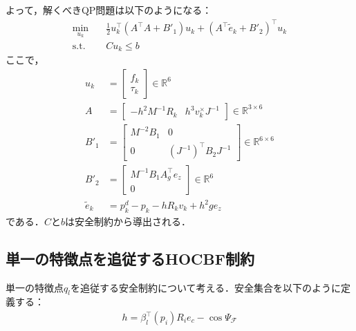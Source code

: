 よって，解くべきQP問題は以下のようになる：
\begin{equation}
\begin{aligned}
\min_{u_k} \quad & \frac{1}{2} u_k^\top (A^\top A + B'_1) u_k + (A^\top \tilde{e}_k + B'_2)^\top u_k \\
\mathrm{s.t.} \quad & C u_k \leq b
\label{eq:holonomic_qp}
\end{aligned}
\end{equation}
ここで，
\begin{equation}
\begin{aligned}
u_k &= \begin{bmatrix} f_k \\ \tau_k \end{bmatrix} \in \mathbb{R}^6 \\
A &= \begin{bmatrix} -h^2 M^{-1} R_k & h^3 v_k^\times J^{-1} \end{bmatrix} \in \mathbb{R}^{3 \times 6} \\
B'_1 &= \begin{bmatrix} M^{-2} B_1 & 0 \\ 0 & (J^{-1})^\top B_2 J^{-1} \end{bmatrix} \in \mathbb{R}^{6 \times 6} \\
B'_2 &= \begin{bmatrix} M^{-1} B_1 A_g^\top e_z \\ 0 \end{bmatrix} \in \mathbb{R}^6 \\
\tilde{e}_k &= p^d_k - p_k - h R_k v_k + h^2 g e_z
\label{eq:holonomic_qp_params}
\end{aligned}
\end{equation}
である．$C$と$b$は安全制約から導出される．

\subsection{単一の特徴点を追従するHOCBF制約}

単一の特徴点$q_l$を追従する安全制約について考える．安全集合を以下のように定義する：
\begin{equation}
\begin{aligned}
h = \beta_l^\top(p_i) R_i e_c - \cos\Psi_{\mathcal{F}}
\label{eq:single_hocbf_safe_set}
\end{aligned}
\end{equation}

